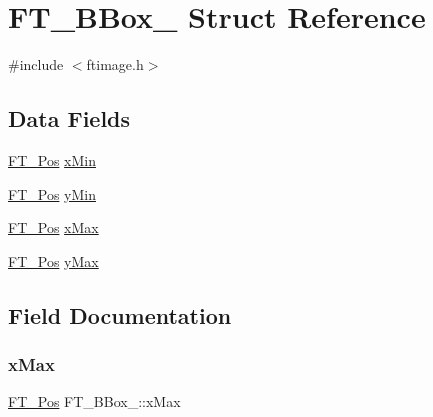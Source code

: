 \hypertarget{struct_f_t___b_box__}{}\section{F\+T\+\_\+\+B\+Box\+\_\+ Struct Reference}
\label{struct_f_t___b_box__}


{\ttfamily \#include $<$ftimage.\+h$>$}

\subsection*{Data Fields}
\begin{DoxyCompactItemize}
\item 
\hyperlink{ftimage_8h_af5f230f4b253d4c7715fd2e595614c90}{F\+T\+\_\+\+Pos} \hyperlink{struct_f_t___b_box___a1f2a5d0565d496c1d41e43d018f45add}{x\+Min}
\item 
\hyperlink{ftimage_8h_af5f230f4b253d4c7715fd2e595614c90}{F\+T\+\_\+\+Pos} \hyperlink{struct_f_t___b_box___a959ca1d5bc1c5338da0d85c8e7135f4e}{y\+Min}
\item 
\hyperlink{ftimage_8h_af5f230f4b253d4c7715fd2e595614c90}{F\+T\+\_\+\+Pos} \hyperlink{struct_f_t___b_box___ac6da5c44f4cb7b97eef1f438eb69c0ec}{x\+Max}
\item 
\hyperlink{ftimage_8h_af5f230f4b253d4c7715fd2e595614c90}{F\+T\+\_\+\+Pos} \hyperlink{struct_f_t___b_box___a77084921589f386a8a593ae1f25b1569}{y\+Max}
\end{DoxyCompactItemize}


\subsection{Field Documentation}
\mbox{\label{struct_f_t___b_box___ac6da5c44f4cb7b97eef1f438eb69c0ec}} 
\subsubsection{\texorpdfstring{x\+Max}{xMax}}
{\footnotesize\ttfamily \hyperlink{ftimage_8h_af5f230f4b253d4c7715fd2e595614c90}{F\+T\+\_\+\+Pos} F\+T\+\_\+\+B\+Box\+\_\+\+::x\+Max}

\mbox{\label{struct_f_t___b_box___a1f2a5d0565d496c1d41e43d018f45add}} 
